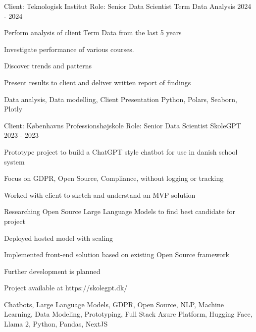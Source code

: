 \begin{cventries}
\cventry
{Client: Teknologisk Institut \newline Role: Senior Data Scientist} %
{Term Data Analysis} %
{}%
{2024 - 2024} %
{ %
\begin{cvitems}
\item {Perform analysis of client Term Data from the last 5 years}
\item {Investigate performance of various courses.}
\item {Discover trends and patterns}
\item {Present results to client and deliver written report of findings}
\end{cvitems}
\cventrykeywords
{Data analysis, Data modelling, Client Presentation}
{Python, Polars, Seaborn, Plotly}
}

\cventry
{Client: Københavns Professionshøjskole \newline Role: Senior Data Scientist} %
{SkoleGPT} %
{}%
{2023 - 2023} %
{ %
\begin{cvitems}
\item {Prototype project to build a ChatGPT style chatbot for use in danish school system}
\item {Focus on GDPR, Open Source, Compliance, without logging or tracking}
\item {Worked with client to sketch and understand an MVP solution}
\item {Researching Open Source Large Language Models to find best candidate for project}
\item {Deployed hosted model with scaling}
\item {Implemented front-end solution based on existing Open Source framework}
\item {Further development is planned}
\item {Project available at https://skolegpt.dk/}
\end{cvitems}
\cventrykeywords
{Chatbots, Large Language Models, GDPR, Open Source, NLP, Machine Learning, Data Modeling, Prototyping, Full Stack}
{Azure Platform, Hugging Face, Llama 2, Python, Pandas, NextJS}
}


\end{cventries}

